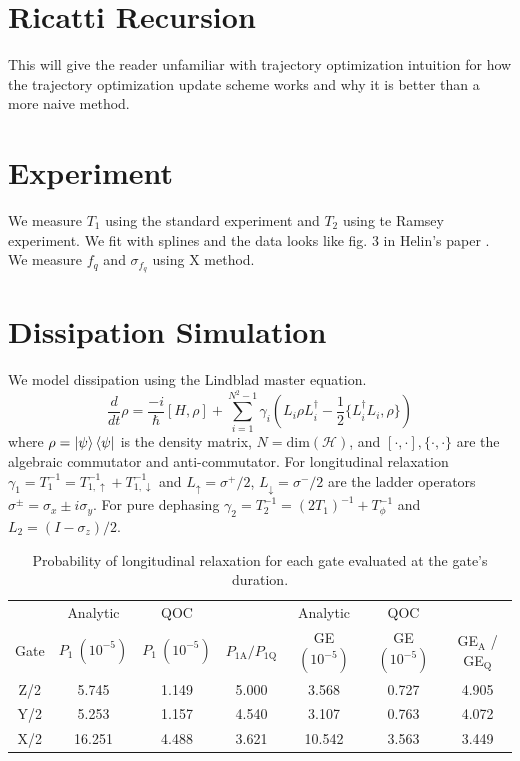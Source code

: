 \documentclass[
  amsfonts,
  amsmath,
  tbtags,
  amssymb,
  aps,
  nobibnotes,
  twocolumn,
  superscriptaddress,
]{revtex4-2}
\begin{document}
\appendix
\section{Ricatti Recursion}
This will give the reader unfamiliar with trajectory
optimization intuition for how the trajectory optimization
update scheme works and why it is better than
a more naive method.


\section{Experiment}
We measure $T_{1}$ using the standard experiment
and $T_{2}$ using te Ramsey experiment. We fit with splines
and the data looks like fig. 3 in Helin's paper \cite{zhang2020universal}.
We measure $f_{q}$ and $\sigma_{f_{q}}$ using X method.


\section{Dissipation Simulation}
We model dissipation using the Lindblad master
equation. 
\begin{equation}
  \frac{d}{dt} \rho = \frac{-i}{\hbar} [H, \rho] + \sum_{i = 1}^{N^{2} - 1} \gamma_{i} (L_{i} \rho L_{i}^{\dagger} - \frac{1}{2} \{L_{i}^{\dagger} L_{i}, \rho\})
\end{equation}
where $\rho = \ket{\psi}\bra{\psi}$ is the density matrix, $N = \textrm{dim}(\mathcal{H})$,
and $[\cdot, \cdot], \{\cdot, \cdot \}$ are the algebraic commutator and anti-commutator.
For longitudinal relaxation $\gamma_{1} = T_{1}^{-1} = T_{1, \uparrow}^{-1} + T_{1, \downarrow}^{-1}$
and $L_{\uparrow} = \sigma^{+}/2$,
$L_{\downarrow} = \sigma^{-}/2$
are the ladder operators $\sigma^{\pm} = \sigma_{x} \pm i \sigma_{y}$. For pure dephasing
$\gamma_{2} = T_{2}^{-1} = (2 T_{1})^{-1} + T_{\phi}^{-1}$ and
$L_{2} = (I - \sigma_{z})/2$.

\begin{table}[ht]
  \begin{tabular}{c | c | c | c | c | c | c}
         & Analytic & QOC & & Analytic & QOC & \\
    Gate & $P_{1}\ (10^{-5})$ & $P_{1}\ (10^{-5})$ & $P_{1\textrm{A}} / P_{1\textrm{Q}}$
    & GE $(10^{-5})$ & GE $(10^{-5})$ & GE$_{\textrm{A}}$ / GE$_{\textrm{Q}}$\\
    \hline
    Z/2 & 5.745  & 1.149 & 5.000 & 3.568  & 0.727 & 4.905\\
    Y/2 & 5.253  & 1.157 & 4.540 & 3.107  & 0.763 & 4.072\\
    X/2 & 16.251 & 4.488 & 3.621 & 10.542 & 3.563 & 3.449\\
  \end{tabular}
  \caption{Probability of longitudinal relaxation for each gate
    evaluated at the gate's duration.}
\end{table}
\end{document}
